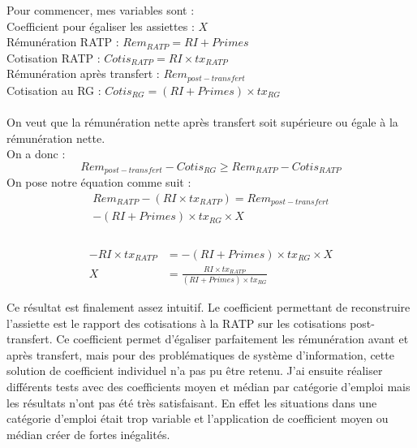 Pour commencer, mes variables sont : \\
Coefficient pour égaliser les assiettes : \(X\) \\
Rémunération RATP : \(Rem_{RATP} = RI + Primes\) \\
Cotisation RATP : \(Cotis_{RATP} = RI \times tx_{RATP}\) \\
Rémunération après transfert : \(Rem_{post-transfert}\) \\
Cotisation au RG : \(Cotis_{RG} = (RI + Primes) \times tx_{RG}\) \\
\\
On veut que la rémunération nette après transfert soit supérieure ou égale à la rémunération nette. \\
On a donc : 
\[
Rem_{post-transfert} - Cotis_{RG} \geq Rem_{RATP} - Cotis_{RATP}
\]
On pose notre équation comme suit : 
\begin{multline*}
Rem_{RATP} - (RI \times tx_{RATP}) = Rem_{post-transfert} \\
- (RI + Primes) \times tx_{RG} \times X \\
\end{multline*}
 \\
\begin{align*}
- RI \times tx_{RATP} &= - (RI + Primes) \times tx_{RG} \times X\\
X &= \frac{RI \times tx_{RATP}}{(RI + Primes) \times tx_{RG}} 
\end{align*}


Ce résultat est finalement assez intuitif. Le coefficient permettant de reconstruire l'assiette est le rapport des cotisations à la RATP sur les cotisations post-transfert. Ce coefficient permet d'égaliser parfaitement les rémunération avant et après transfert, mais pour des problématiques de système d'information, cette solution de coefficient individuel n'a pas pu être retenu. J'ai ensuite réaliser différents tests avec des coefficients moyen et médian par catégorie d'emploi mais les résultats n'ont pas été très satisfaisant. En effet les situations dans une catégorie d'emploi était trop variable et l'application de coefficient moyen ou médian créer de fortes inégalités.

